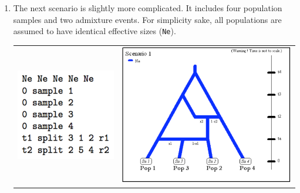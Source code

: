 \begin{enumerate}
\item The next scenario is slightly more complicated. It includes four population samples and two admixture events.
For simplicity sake, all populations are assumed to have identical effective sizes (\texttt{Ne}).\\
\begin{center} 
\begin{tabular}{cc}
\includegraphics[scale=0.5]{code_scenario_04.pdf} & \includegraphics[scale=0.35]{scenario_04.pdf} \\
\end{tabular}
\end{center}




\end{enumerate}
